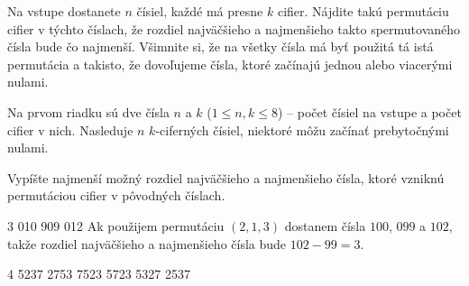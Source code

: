 




Na vstupe dostanete $n$ čísiel, každé má presne $k$ cifier. Nájdite takú permutáciu cifier v týchto
číslach, že rozdiel najväčšieho a najmenšieho takto spermutovaného čísla bude čo najmenší. Všimnite
si, že na všetky čísla má byť použitá tá istá permutácia a takisto, že dovoľujeme čísla, ktoré
začínajú jednou alebo viacerými nulami.


Na prvom riadku sú dve čísla $n$ a $k$ ($1 \leq n, k \leq 8$) -- počet čísiel na vstupe a počet
cifier v nich. Nasleduje $n$ $k$-ciferných čísiel, niektoré môžu začínať prebytočnými nulami.


Vypíšte najmenší možný rozdiel najväčšieho a najmenšieho čísla, ktoré vzniknú permutáciou cifier v
pôvodných číslach.


 3
010
909
012
\komentar
Ak použijem permutáciu $(2, 1, 3)$ dostanem čísla $100$, $099$ a $102$, takže rozdiel najväčšieho a
najmenšieho čísla bude $102 - 99 = 3$.
\koniec

 4
5237
2753
7523
5723
5327
2537
\koniec


